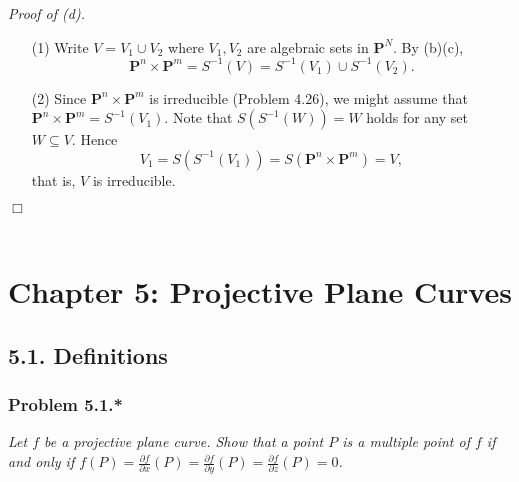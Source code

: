 \documentclass{article}
\begin{document}
\emph{Proof of (d).}
\begin{enumerate}
\item[(1)]
  Write $V = V_1 \cup V_2$ where $V_1, V_2$ are algebraic sets in $\mathbf{P}^{N}$.
  By (b)(c),
  \[
    \mathbf{P}^{n} \times \mathbf{P}^{m}
    = S^{-1}(V)
    = S^{-1}(V_1) \cup S^{-1}(V_2).
  \]

\item[(2)]
  Since $\mathbf{P}^{n} \times \mathbf{P}^{m}$ is irreducible (Problem 4.26),
  we might assume that $\mathbf{P}^{n} \times \mathbf{P}^{m} = S^{-1}(V_1)$.
  Note that $S(S^{-1}(W)) = W$ holds for any set $W \subseteq V$.
  Hence
  \[
    V_1 = S(S^{-1}(V_1)) = S(\mathbf{P}^{n} \times \mathbf{P}^{m}) = V,
  \]
  that is, $V$ is irreducible.
\end{enumerate}
$\Box$ \\\\






\newpage
\section*{Chapter 5: Projective Plane Curves\\}



\subsection*{5.1. Definitions \\}



\subsubsection*{Problem 5.1.*}
\emph{Let $f$ be a projective plane curve.
Show that a point $P$ is a multiple point of $f$ if and only if
$f(P)
= \frac{\partial f}{\partial x}(P)
= \frac{\partial f}{\partial y}(P)
= \frac{\partial f}{\partial z}(P) = 0$.} \\
\end{document}
